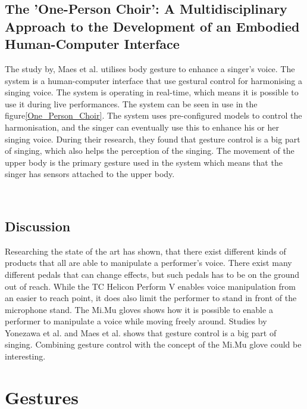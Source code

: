 \subsection{The 'One-Person Choir': A Multidisciplinary Approach to the Development of an Embodied Human-Computer Interface}
The study by, Maes et al. \citep{Maes_2011} utilises body gesture to enhance a singer's voice. The system is a human-computer interface that use gestural control for harmonising a singing voice. The system is operating in real-time, which means it is possible to use it during live performances. The system can be seen in use in the figure\ref{One_Person_Choir}. The system uses pre-configured models to control the harmonisation, and the singer can eventually use this to enhance his or her singing voice. 
During their research, they found that gesture control is a big part of singing, which also helps the perception of the singing. The movement of the upper body is the primary gesture used in the system which means that the singer has sensors attached to the upper body.\\

\begin{minipage}{\linewidth}%
\label{One_Person_Choir}
\end{minipage}\\

\subsection{Discussion}

Researching the state of the art has shown, that there exist different kinds of products that all are able to manipulate a performer's voice. There exist many different pedals that can change effects, but such pedals has to be on the ground out of reach. 
While the TC Helicon Perform V enables voice manipulation from an easier to reach point, it does also limit the performer to stand in front of the microphone stand. 
The Mi.Mu gloves shows how it is possible to enable a performer to manipulate a voice while moving freely around. Studies by Yonezawa et al. and Maes et al. shows that gesture control is a big part of singing. Combining gesture control with the concept of the Mi.Mu glove could be interesting.


\section{Gestures}

